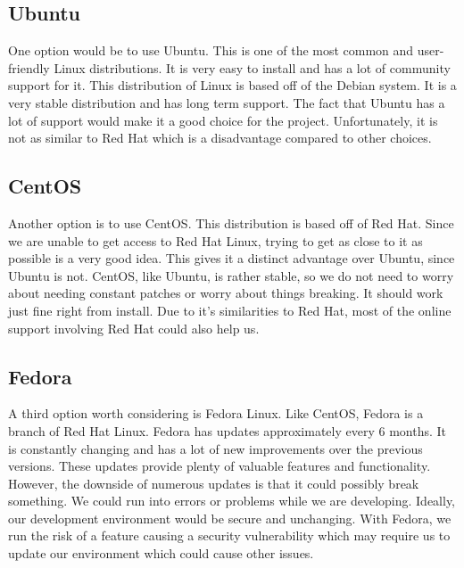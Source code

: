 \documentclass[onecolumn, draftclsnofoot,10pt, compsoc]{IEEEtran}
\begin{document}
\subsection{Ubuntu}
One option would be to use Ubuntu. This is one of the most common and user-friendly Linux distributions. It is very easy to install and has a lot of community support for it. This distribution of Linux is based off of the Debian system.\cite{rh_vs_deb} It is a very stable distribution and has long term support. The fact that Ubuntu has a lot of support would make it a good choice for the project. Unfortunately, it is not as similar to Red Hat which is a disadvantage compared to other choices.  

\subsection{CentOS}
Another option is to use CentOS. This distribution is based off of Red Hat. Since we are unable to get access to Red Hat Linux, trying to get as close to it as possible is a very good idea. This gives it a distinct advantage over Ubuntu, since Ubuntu is not. CentOS, like Ubuntu, is rather stable, so we do not need to worry about needing constant patches or worry about things breaking. It should work just fine right from install. Due to it's similarities to Red Hat, most of the online support involving Red Hat could also help us.\cite{rh_vs_deb} 

\subsection{Fedora}
A third option worth considering is Fedora Linux. Like CentOS, Fedora is a branch of Red Hat Linux. Fedora has updates approximately every 6 months.\cite{cent_vs_fed} It is constantly changing and has a lot of new improvements over the previous versions. These updates provide plenty of valuable features and functionality. However, the downside of numerous updates is that it could possibly break something. We could run into errors or problems while we are developing. Ideally, our development environment would be secure and unchanging. With Fedora, we run the risk of a feature causing a security vulnerability which may require us to update our environment which could cause other issues. \cite{cent_vs_fed}
\end{document}
